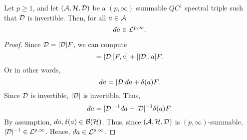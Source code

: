 \begin{theorem}
    Let $p \geq 1$, and
    let $(\mathcal{A},\mathcal{H},\mathcal{D})$ be a $(p,\infty)$ summable $QC^1$ spectral triple such that $\mathcal{D}$
    is invertible. Then, for all $a \in \mathcal{A}$
    \begin{equation}
        \qd a \in \mathcal{L}^{p,\infty}.
    \end{equation}
\end{theorem}
\begin{proof}
    Since $\mathcal{D} = |\mathcal{D}|F$, we can compute
    \begin{equation}
        [\D,a] = |\D|[F,a] + [|\D|,a]F.
    \end{equation}
    Or in other words,
    \begin{equation}
        da = |\D|\qd a + \delta(a)F.
    \end{equation}
    Since $\mathcal{D}$ is invertible, $|\mathcal{D}|$ is invertible. Thus,
    \begin{equation*}
        \qd a = |\D|^{-1}da + |\D|^{-1}\delta(a)F.
    \end{equation*}
    By assumption, $da,\delta(a) \in \mathcal{B}(\mathcal{H})$. Thus,
    since $(\mathcal{A},\mathcal{H},\mathcal{D})$ is $(p,\infty)$-summable, $|\mathcal{D}|^{-1} \in \mathcal{L}^{p,\infty}$.
    Hence, $\qd a \in \mathcal{L}^{p,\infty}$.
\end{proof} 

